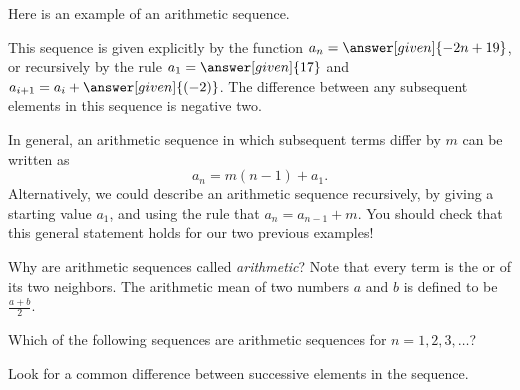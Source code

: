 \documentclass{ximera}
\begin{document}
\begin{example}
  Here is an example of an arithmetic sequence.
  \begin{image}
  \end{image}
  This sequence is given explicitly by the function $a_n=\answer[given]{-2n + 19}$, or
  recursively by the rule $a_1 = \answer[given]{17}$ and $a_{i+1} = a_i +
  \answer[given]{(-2)}$. The difference between any subsequent elements in this sequence is negative
  two.
\end{example}



In general, an arithmetic sequence in which subsequent terms differ
by $m$ can be written as
\[
a_n = m (n-1) + a_1.
\]
Alternatively, we could describe an arithmetic sequence recursively,
by giving a starting value $a_1$, and using the rule that $a_{n} =
a_{n-1} + m$.  You should check that this general statement holds for our 
two previous examples!


\begin{remark}
Why are arithmetic sequences called \textit{arithmetic}?  Note that
every term is the  or  of its two
neighbors.  The arithmetic mean of two numbers $a$ and $b$ is defined
to be $\frac{a+b}{2}$.
\end{remark}



\begin{question}
  Which of the following sequences are arithmetic sequences for
  $n=1,2,3,\dots$?
  \begin{selectAll}
  \end{selectAll}
  \begin{hint}
    Look for a common difference between successive elements in the sequence. 
  \end{hint}
\end{question}
\end{document}
